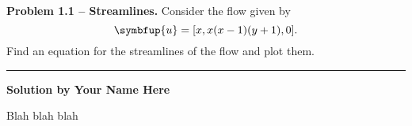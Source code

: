 \documentclass[10pt, a5paper, twoside, openany]{memoir}
\renewcommand\vec{\symbfup}
\newcounter{problem}[chapter]
\newenvironment{problem}[1][ ]{\noindent \textbf{Problem #1.}}{\vspace{0.1in}}
\begin{document}
%
%


\begin{problem}[1.1 -- Streamlines]
Consider the flow given by 
\[
\vec{u} = [x, x(x-1)(y+1), 0].
\]
Find an equation for the streamlines of the flow and plot them.

\end{problem}

\hrule
\vspace{0.1in}

\noindent \textbf{Solution by Your Name Here}

Blah blah blah
\end{document}
